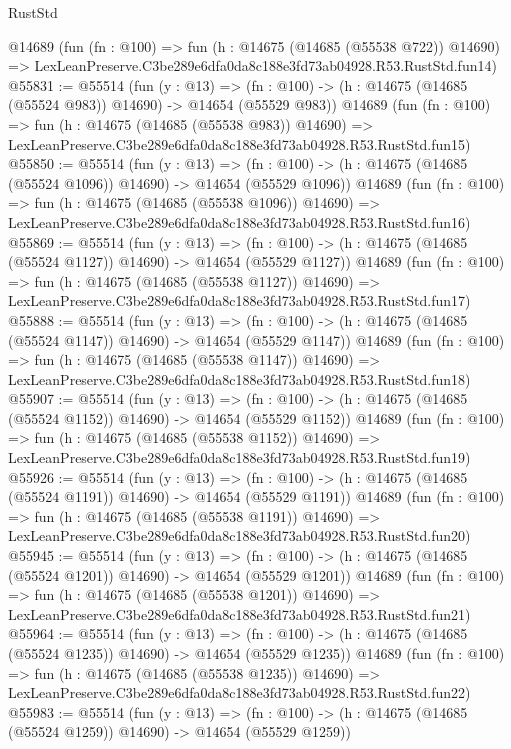 \begin{lexlean}{RustStd}
\begin{coremodule}
    @14689
    (fun (fn : @100) =>
    fun (h : @14675 (@14685 (@55538 @722)) @14690) =>
    LexLeanPreserve.C3be289e6dfa0da8c188e3fd73ab04928.R53.RustStd.fun14)
@55831 := @55514
    (fun (y : @13) =>
    (fn : @100) -> (h : @14675 (@14685 (@55524 @983)) @14690) -> @14654 (@55529 @983))
    @14689
    (fun (fn : @100) =>
    fun (h : @14675 (@14685 (@55538 @983)) @14690) =>
    LexLeanPreserve.C3be289e6dfa0da8c188e3fd73ab04928.R53.RustStd.fun15)
@55850 := @55514
    (fun (y : @13) =>
    (fn : @100) -> (h : @14675 (@14685 (@55524 @1096)) @14690) -> @14654 (@55529 @1096))
    @14689
    (fun (fn : @100) =>
    fun (h : @14675 (@14685 (@55538 @1096)) @14690) =>
    LexLeanPreserve.C3be289e6dfa0da8c188e3fd73ab04928.R53.RustStd.fun16)
@55869 := @55514
    (fun (y : @13) =>
    (fn : @100) -> (h : @14675 (@14685 (@55524 @1127)) @14690) -> @14654 (@55529 @1127))
    @14689
    (fun (fn : @100) =>
    fun (h : @14675 (@14685 (@55538 @1127)) @14690) =>
    LexLeanPreserve.C3be289e6dfa0da8c188e3fd73ab04928.R53.RustStd.fun17)
@55888 := @55514
    (fun (y : @13) =>
    (fn : @100) -> (h : @14675 (@14685 (@55524 @1147)) @14690) -> @14654 (@55529 @1147))
    @14689
    (fun (fn : @100) =>
    fun (h : @14675 (@14685 (@55538 @1147)) @14690) =>
    LexLeanPreserve.C3be289e6dfa0da8c188e3fd73ab04928.R53.RustStd.fun18)
@55907 := @55514
    (fun (y : @13) =>
    (fn : @100) -> (h : @14675 (@14685 (@55524 @1152)) @14690) -> @14654 (@55529 @1152))
    @14689
    (fun (fn : @100) =>
    fun (h : @14675 (@14685 (@55538 @1152)) @14690) =>
    LexLeanPreserve.C3be289e6dfa0da8c188e3fd73ab04928.R53.RustStd.fun19)
@55926 := @55514
    (fun (y : @13) =>
    (fn : @100) -> (h : @14675 (@14685 (@55524 @1191)) @14690) -> @14654 (@55529 @1191))
    @14689
    (fun (fn : @100) =>
    fun (h : @14675 (@14685 (@55538 @1191)) @14690) =>
    LexLeanPreserve.C3be289e6dfa0da8c188e3fd73ab04928.R53.RustStd.fun20)
@55945 := @55514
    (fun (y : @13) =>
    (fn : @100) -> (h : @14675 (@14685 (@55524 @1201)) @14690) -> @14654 (@55529 @1201))
    @14689
    (fun (fn : @100) =>
    fun (h : @14675 (@14685 (@55538 @1201)) @14690) =>
    LexLeanPreserve.C3be289e6dfa0da8c188e3fd73ab04928.R53.RustStd.fun21)
@55964 := @55514
    (fun (y : @13) =>
    (fn : @100) -> (h : @14675 (@14685 (@55524 @1235)) @14690) -> @14654 (@55529 @1235))
    @14689
    (fun (fn : @100) =>
    fun (h : @14675 (@14685 (@55538 @1235)) @14690) =>
    LexLeanPreserve.C3be289e6dfa0da8c188e3fd73ab04928.R53.RustStd.fun22)
@55983 := @55514
    (fun (y : @13) =>
    (fn : @100) -> (h : @14675 (@14685 (@55524 @1259)) @14690) -> @14654 (@55529 @1259))

\end{coremodule}
\end{lexlean}
